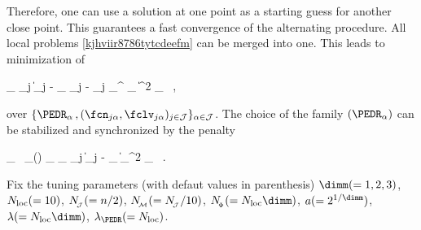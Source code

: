 Therefore, one can use a solution at one point as a starting guess for another close point.
This guarantees a fast convergence of the alternating procedure. 
All local problems \eqref{kjhviir8786tytcdeefm} can be merged into one.
This leads to minimization of
\begin{EQA}[c]
	\sum_{\jl \in \JJJ} \sum_{j \in \JJJ}
	\bigl\| \Imav_{j} - \fcn_{\jjl} \Sv_{j} - \UV_{j} \PEDR_{\jl}^{\T} \fclv_{\jjl} \bigr\|^{2} \weightM_{\jjl}
	\, ,
	\qquad \quad
\label{kjhviir8786tytcdeefde}
\end{EQA}
over \( \{ \PEDR_{\jl} \, , (\fcn_{\jjl},\fclv_{\jjl})_{j \in \JJJ} \}_{\jl \in \JJJ} \).
%
%
The choice of the family \( (\PEDR_{\jl}) \) can be stabilized and synchronized by the penalty
\begin{EQA}[c]
	\lambda_{\PEDR} \, \pent_{\PEDR}(\PEDR)
	\eqdef
	\lambda_{\PEDR} \sum_{\jl \in \JJJ} \sum_{j \in \JJJ} \| \PEDR_{j} - \PEDR_{\jl} \|_{\Fr}^{2} 
	\; \weightM_{\jjl}
	\, .
\end{EQA}





\label{SEDRmanproc}

Fix the tuning parameters (with defaut values in parenthesis)
\( \dimm (=1,2,3) \), 
\( N_{\operatorname{loc}} (= 10) \), 
\( N_{\!_{\mathcal{J}}} (= n/2) \), 
\( N_{_{\! \mathcal{M}}} (= N_{\!_{\mathcal{J}}}/10) \),
\( \nSph (= \nmin \dimm) \),
\( a (= 2^{1/\dimm}) \), 
\( \lambda (= \nmin \dimm) \),
\( \lambda_{\PEDR} (=\nmin) \).

